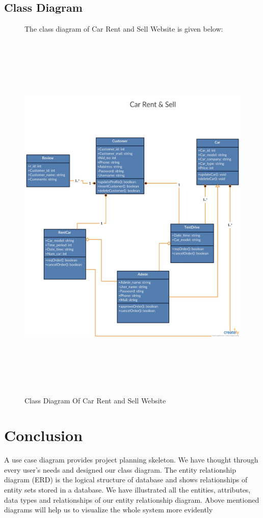 \noindent

\subsection{ Class Diagram}

\begin{figure}

\noindent The class diagram of Car Rent and Sell Website is given below:

\noindent \includegraphics*[width=5.48in, height=7.2in, keepaspectratio=false]{figures/ClassDiagram}
\caption{Class Diagram Of Car Rent and Sell Website}
\end{figure}
\noindent 


\noindent 
\section{ Conclusion}

\noindent A use case diagram provides project planning skeleton. We have thought through every user’s needs and designed our class diagram. The entity relationship diagram (ERD) is the logical structure of database and shows relationships of entity sets stored in a database. We have illustrated all the entities, attributes, data types and relationships of our entity relationship diagram. Above mentioned diagrams will help us to visualize the whole system more evidently


\noindent 

\noindent 





